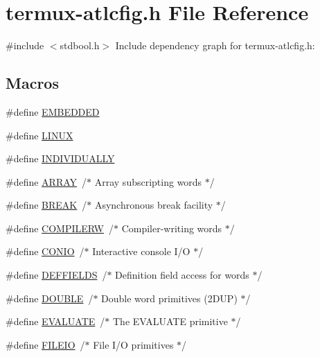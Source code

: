 \hypertarget{termux-atlcfig_8h}{}\section{termux-\/atlcfig.h File Reference}
\label{termux-atlcfig_8h}
{\ttfamily \#include $<$stdbool.\+h$>$}\newline
Include dependency graph for termux-\/atlcfig.h\+:
\subsection*{Macros}
\begin{DoxyCompactItemize}
\item 
\#define \hyperlink{termux-atlcfig_8h_ae47a1cb6076cec70cf9ea8efc1d5f3ff}{E\+M\+B\+E\+D\+D\+ED}
\item 
\#define \hyperlink{termux-atlcfig_8h_a157a956e14c5c44b3f73ef23a4776f64}{L\+I\+N\+UX}
\item 
\#define \hyperlink{termux-atlcfig_8h_a48c036bd8ba1fdc29f0981ff7ee3d9b5}{I\+N\+D\+I\+V\+I\+D\+U\+A\+L\+LY}
\item 
\#define \hyperlink{termux-atlcfig_8h_af579248b8d4c16c0aeba3dff9ee8b10a}{A\+R\+R\+AY}~/$\ast$ Array subscripting words $\ast$/
\item 
\#define \hyperlink{termux-atlcfig_8h_abe022c8f09db1f0680a92293523f25dd}{B\+R\+E\+AK}~/$\ast$ Asynchronous break facility $\ast$/
\item 
\#define \hyperlink{termux-atlcfig_8h_a6e870e0dd56eee50bae52b101eb2634d}{C\+O\+M\+P\+I\+L\+E\+RW}~/$\ast$ Compiler-\/writing words $\ast$/
\item 
\#define \hyperlink{termux-atlcfig_8h_a1dd720c7eba235287553f1628c4687e8}{C\+O\+N\+IO}~/$\ast$ Interactive console I/O $\ast$/
\item 
\#define \hyperlink{termux-atlcfig_8h_a5e8c22a8ef7ae74e64818fed0e1427e5}{D\+E\+F\+F\+I\+E\+L\+DS}~/$\ast$ Definition field access for words $\ast$/
\item 
\#define \hyperlink{termux-atlcfig_8h_a8747af38b86aa2bbcda2f1b1aa0888c2}{D\+O\+U\+B\+LE}~/$\ast$ Double word primitives (2\+D\+U\+P) $\ast$/
\item 
\#define \hyperlink{termux-atlcfig_8h_ad3787f1b5599150eab9d3ca887d75640}{E\+V\+A\+L\+U\+A\+TE}~/$\ast$ The E\+V\+A\+L\+U\+A\+TE primitive $\ast$/
\item 
\#define \hyperlink{termux-atlcfig_8h_a6031789d52541d1bd1e7b028322fd7fd}{F\+I\+L\+E\+IO}~/$\ast$ File I/O primitives $\ast$/
\item 

\end{DoxyCompactItemize}
